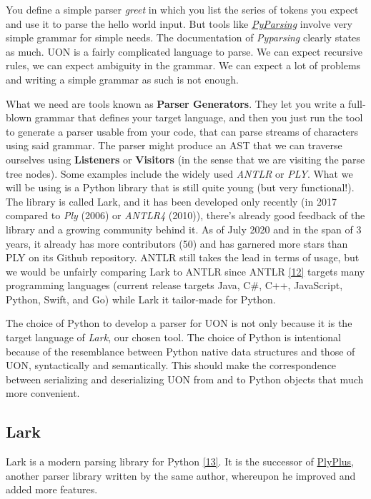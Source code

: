 \documentclass[12pt]{article}
\begin{document}
You define a simple parser \emph{greet} in which you list the series of tokens you expect and use it to parse the hello world input. But tools like \href{https://github.com/pyparsing/pyparsing}{\emph{PyParsing}} involve very simple grammar for simple needs. The documentation of \emph{Pyparsing} clearly states as much. UON is a fairly complicated language to parse. We can expect recursive rules, we can expect ambiguity in the grammar. We can expect a lot of problems and writing a simple grammar as such is not enough.

What we need are tools known as \textbf{Parser Generators}. They let you write a full-blown grammar that defines your target language, and then you just run the tool to generate a parser usable from your code, that can parse streams of characters using said grammar. The parser might produce an AST that we can traverse ourselves using \textbf{Listeners} or \textbf{Visitors} (in the sense that we are visiting the parse tree nodes). Some examples include the widely used \emph{ANTLR} or \emph{PLY}.
What we will be using is a Python library that is still quite young (but very functional!). The library is called Lark, and it has been developed only recently (in 2017 compared to \emph{Ply} (2006) or \emph{ANTLR4} (2010)), there's already good feedback of the library and a growing community behind it. As of July 2020 and in the span of 3 years, it already has more contributors (50) and has garnered more stars than PLY on its Github repository. ANTLR still takes the lead in terms of usage, but we would be unfairly comparing Lark to ANTLR since ANTLR \href{https://github.com/antlr/antlr4/blob/master/doc/targets.md}{[12]} targets many programming languages (current release targets Java, C\#, C++, JavaScript, Python, Swift, and Go) while Lark it tailor-made for Python.

The choice of Python to develop a parser for UON is not only because it is the target language of \emph{Lark}, our chosen tool. The choice of Python is intentional because of the resemblance between Python native data structures and those of UON, syntactically and semantically. This should make the correspondence between serializing and deserializing UON from and to Python objects that much more convenient.

\pagebreak

\subsection{Lark}\label{lark}
Lark is a modern parsing library for Python \href{https://github.com/lark-parser/lark}{[13]}.
It is the successor of \href{https://github.com/erezsh/plyplus}{PlyPlus}, another parser library written by the same author, whereupon he improved and added more features.
\end{document}
